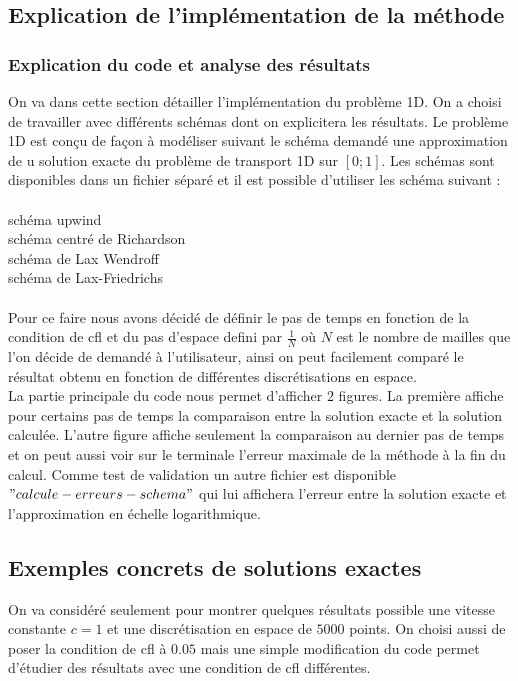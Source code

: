 \documentclass[12pt]{article}
\begin{document}
\subsection{Explication de l'implémentation de la méthode}
\subsubsection{Explication du code et analyse des résultats}
On va dans cette section détailler l'implémentation du problème 1D.
On a choisi de travailler  avec différents schémas dont on explicitera les résultats.
Le problème 1D est conçu de façon à modéliser suivant le schéma demandé une approximation de u solution exacte du problème de transport 1D sur $[0;1]$.
Les schémas sont disponibles dans un fichier séparé et il est possible d'utiliser les schéma suivant :
\\
\\schéma upwind
\\schéma centré de Richardson
\\schéma de Lax Wendroff
\\schéma de Lax-Friedrichs
\\
\\Pour ce faire nous avons décidé de définir le pas de temps en fonction de la condition de cfl et du pas d'espace defini par $\frac{1}{N}$ où $N$ est le nombre de mailles que l'on décide de demandé à l'utilisateur, ainsi on peut facilement comparé le résultat obtenu en fonction de différentes discrétisations en espace.
\\La partie principale du code nous permet d'afficher $2$ figures. La première affiche pour certains pas de temps la comparaison entre la solution exacte et la solution calculée. L'autre figure affiche seulement la comparaison au dernier pas de temps et on peut aussi voir sur le terminale l'erreur maximale de la méthode à la fin du calcul. Comme test de validation un autre fichier est disponible $"calcule-erreurs -schema"$ qui lui affichera l'erreur entre la solution exacte et l'approximation en échelle logarithmique.
\subsection{Exemples concrets de solutions exactes}
On va considéré seulement pour montrer quelques résultats possible une vitesse constante $c=1$ et une discrétisation en espace de $5000$ points.
On choisi aussi de poser la condition de cfl à $0.05$ mais une simple modification du code permet d'étudier des résultats avec une condition de cfl différentes.
\end{document}
